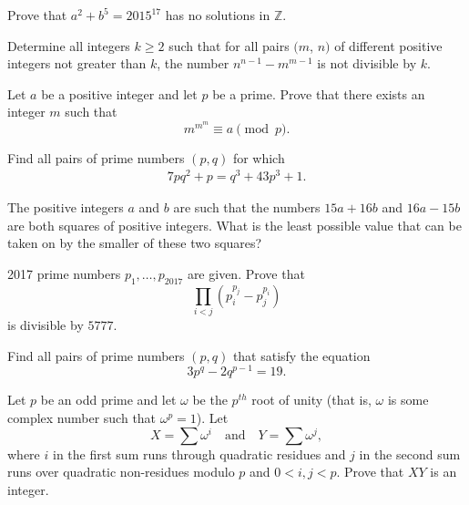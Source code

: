 \documentclass{subfile}
\begin{document}
	\begin{problem} %
		Prove that $a^{2}+b^{5}=2015^{17}$ has no solutions in $\mathbb{Z}$.
	\end{problem}

	\begin{problem} %
		Determine all integers $ k\ge 2$ such that for all pairs $ (m$, $ n)$ of different positive integers not greater than $ k$, the number $ n^{n-1}-m^{m-1}$ is not divisible by $ k$.
	\end{problem}

	\begin{problem}[ELMO 2000] %
		Let $a$ be a positive integer and let $p$ be a prime. Prove that there exists an integer $m$ such that \[ m^{m^m} \equiv a \pmod p. \]
	\end{problem}

	\begin{problem} %
		Find all pairs of prime numbers $(p,q)$ for which
		\begin{align*}
		7pq^2 + p = q^3 + 43p^3 + 1.
		\end{align*}
	\end{problem}

	\begin{problem} [IMO 1996] %
		The positive integers $ a$ and $ b$ are such that the numbers $ 15a + 16b$ and $ 16a - 15b$ are both squares of positive integers. What is the least possible value that can be taken on by the smaller of these two squares?
	\end{problem}

	\begin{problem} %
		2017 prime numbers $p_1,\ldots,p_{2017}$ are given. Prove that $$\prod_{i<j} (p_i^{p_j}-p_j^{p_i})$$ is divisible by $5777$.
	\end{problem}

	\begin{problem}[Ukraine 2014] %
		Find all pairs of prime numbers $(p,q)$ that satisfy the equation $$3p^{q}-2q^{p-1}=19.$$
	\end{problem}

	\begin{problem} %
		Let $p$ be an odd prime and let $\omega$ be the $p^{th}$ root of unity (that is, $\omega$ is some complex number such that $\omega^p = 1$). Let $$X=\sum \omega^i \quad \text{and} \quad Y=\sum \omega^j,$$ where $i$ in the first sum runs through quadratic residues and $j$ in the second sum runs over quadratic non-residues modulo $p$ and $0<i,j<p$. Prove that $XY$ is an integer.
	\end{problem}
\end{document}
